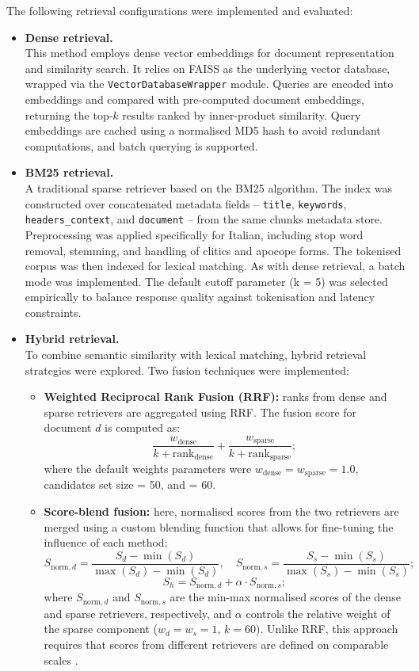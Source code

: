 \begin{spacing}{1.5}
\noindent The following retrieval configurations were implemented and evaluated:
\begin{itemize}
    \item \textbf{Dense retrieval.}\\
    This method employs dense vector embeddings for document representation and similarity search. It relies on FAISS as the underlying vector database, wrapped via the \texttt{VectorDatabaseWrapper} module. Queries are encoded into embeddings and compared with pre-computed document embeddings, returning the top-$k$ results ranked by inner-product similarity. Query embeddings are cached using a normalised MD5 hash to avoid redundant computations, and batch querying is supported.
    \item \textbf{BM25 retrieval.}\\ 
    A traditional sparse retriever based on the BM25 algorithm. The index was constructed over concatenated metadata fields -- \texttt{title}, \texttt{keywords}, \texttt{headers\_context}, and \texttt{document} -- from the same chunks metadata store. Preprocessing was applied specifically for Italian, including stop word removal, stemming, and handling of clitics and apocope forms. The tokenised corpus was then indexed for lexical matching. As with dense retrieval, a batch mode was implemented. The default cutoff parameter (k = 5) was selected empirically to balance response quality against tokenisation and latency constraints.
    \item \textbf{Hybrid retrieval.}\\ 
    To combine semantic similarity with lexical matching, hybrid retrieval strategies were explored. Two fusion techniques were implemented:
    \begin{itemize}
            \item \textbf{Weighted Reciprocal Rank Fusion (RRF):} ranks from dense and sparse retrievers are aggregated using RRF. The fusion score for document $d$ is computed as:
\[
\frac{w_\mathrm{dense}}{k + \mathrm{rank}_\mathrm{dense}} + \frac{w_\mathrm{sparse}}{k + \mathrm{rank}_\mathrm{sparse}} ;
\]
where the default weights parameters were $w_{\text{dense}} = w_{\text{sparse}} = 1.0$, candidates set size = 50, and  = 60.
            \item \textbf{Score-blend fusion:} here, normalised scores from the two retrievers are merged using a custom blending function that allows for fine-tuning the influence of each method:
\[
S_{\text{norm},d} = \frac{S_d - \min(S_d)}{\max(S_d) - \min(S_d)}, \quad  
S_{\text{norm},s} = \frac{S_s - \min(S_s)}{\max(S_s) - \min(S_s)} 
;\]
\[
S_h = S_{\text{norm},d} + \alpha \cdot S_{\text{norm},s} ;
\]
where $S_{\text{norm},d}$ and $S_{\text{norm},s}$ are the min-max normalised scores of the dense and sparse retrievers, respectively, and $\alpha$ controls the relative weight of the sparse component ($w_d = w_s = 1$, $k = 60$). Unlike RRF, this approach requires that scores from different retrievers are defined on comparable scales \parencite{wang_searching_2024}.
\end{itemize}
\end{itemize}




\end{spacing}
